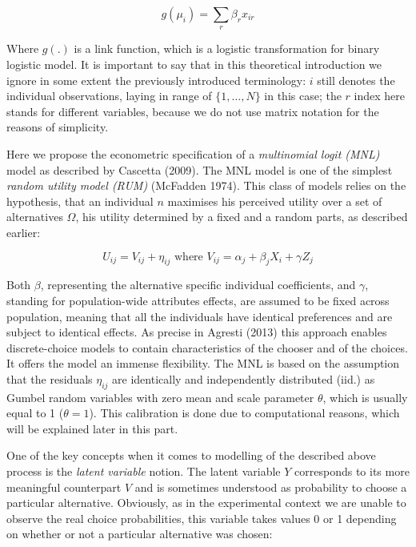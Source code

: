 \documentclass[11pt,]{article}
\begin{document}
\begin{equation}
g(\mu_i) = \sum_r \beta_r x_{ir}
\end{equation}

Where \(g(.)\) is a link function, which is a logistic transformation
for binary logistic model. It is important to say that in this
theoretical introduction we ignore in some extent the previously
introduced terminology: \(i\) still denotes the individual observations,
laying in range of \(\{1, \dots, N \}\) in this case; the \(r\) index
here stands for different variables, because we do not use matrix
notation for the reasons of simplicity.

Here we propose the econometric specification of a \emph{multinomial
logit (MNL)} model as described by Cascetta (2009). The MNL model is one
of the simplest \emph{random utility model (RUM)} (McFadden 1974). This
class of models relies on the hypothesis, that an individual \(n\)
maximises his perceived utility over a set of alternatives \(\Omega\),
his utility determined by a fixed and a random parts, as described
earlier:

\begin{equation}
U_{ij} = V_{ij} + \eta_{ij} \text{ where } V_{ij} = \alpha_j + \beta_j X_i + \gamma Z_j
\end{equation}

Both \(\beta\), representing the alternative specific individual
coefficients, and \(\gamma\), standing for population-wide attributes
effects, are assumed to be fixed across population, meaning that all the
individuals have identical preferences and are subject to identical
effects. As precise in Agresti (2013) this approach enables
discrete-choice models to contain characteristics of the chooser and of
the choices. It offers the model an immense flexibility. The MNL is
based on the assumption that the residuals \(\eta_{ij}\) are identically
and independently distributed (iid.) as Gumbel random variables with
zero mean and scale parameter \(\theta\), which is usually equal to 1
(\(\theta = 1\)). This calibration is done due to computational reasons,
which will be explained later in this part.

One of the key concepts when it comes to modelling of the described
above process is the \emph{latent variable} notion. The latent variable
\(Y\) corresponds to its more meaningful counterpart \(V\) and is
sometimes understood as probability to choose a particular alternative.
Obviously, as in the experimental context we are unable to observe the
real choice probabilities, this variable takes values 0 or 1 depending
on whether or not a particular alternative was chosen:
\end{document}
